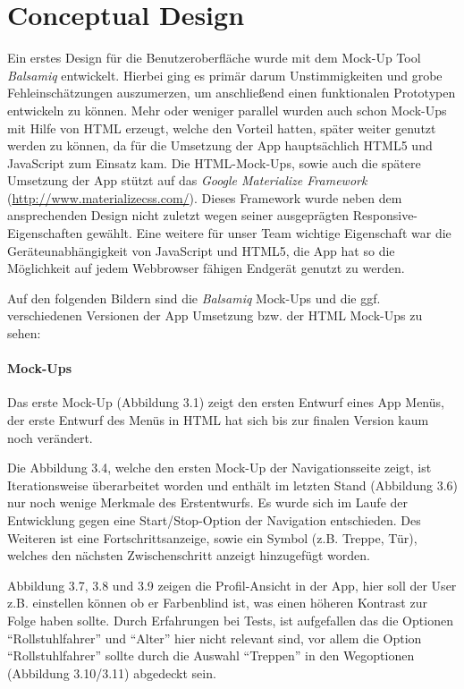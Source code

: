 \chapter{Conceptual Design}
Ein erstes Design für die Benutzeroberfläche wurde mit dem Mock-Up Tool \textit{Balsamiq} entwickelt. Hierbei ging es primär darum Unstimmigkeiten und grobe Fehleinschätzungen auszumerzen, um anschließend einen funktionalen Prototypen entwickeln zu können. Mehr oder weniger parallel wurden auch schon Mock-Ups mit Hilfe von HTML erzeugt, welche den Vorteil hatten, später weiter genutzt werden zu können, da für die Umsetzung der App hauptsächlich HTML5 und JavaScript zum Einsatz kam. Die HTML-Mock-Ups, sowie auch die spätere Umsetzung der App stützt auf das \textit{Google Materialize Framework} (\url{http://www.materializecss.com/}). Dieses Framework wurde neben dem ansprechenden Design nicht zuletzt wegen seiner ausgeprägten Responsive-Eigenschaften gewählt. Eine weitere für unser Team wichtige Eigenschaft war die Geräteunabhängigkeit von JavaScript und HTML5, die App hat so die Möglichkeit auf jedem Webbrowser fähigen Endgerät genutzt zu werden.

Auf den folgenden Bildern sind die \textit{Balsamiq} Mock-Ups und die ggf. verschiedenen Versionen der App Umsetzung bzw. der HTML Mock-Ups zu sehen:

\newpage

\subsubsection*{Mock-Ups}

Das erste Mock-Up (Abbildung 3.1) zeigt den ersten Entwurf eines App Menüs, der erste Entwurf des Menüs in HTML hat sich bis zur finalen Version kaum noch verändert.

Die Abbildung 3.4, welche den ersten Mock-Up der Navigationsseite zeigt, ist Iterationsweise überarbeitet worden und enthält im letzten Stand (Abbildung 3.6) nur noch wenige Merkmale des Erstentwurfs. Es wurde sich im Laufe der Entwicklung gegen eine Start/Stop-Option der Navigation entschieden. Des Weiteren ist eine Fortschrittsanzeige, sowie ein Symbol (z.B. Treppe, Tür), welches den nächsten Zwischenschritt anzeigt hinzugefügt worden.

Abbildung 3.7, 3.8 und 3.9 zeigen die Profil-Ansicht in der App, hier soll der User z.B. einstellen können ob er Farbenblind ist, was einen höheren Kontrast zur Folge haben sollte. Durch Erfahrungen bei Tests, ist aufgefallen das die Optionen "`Rollstuhlfahrer"' und "`Alter"' hier nicht relevant sind, vor allem die Option "`Rollstuhlfahrer"' sollte durch die Auswahl "`Treppen"' in den Wegoptionen (Abbildung 3.10/3.11) abgedeckt sein.

